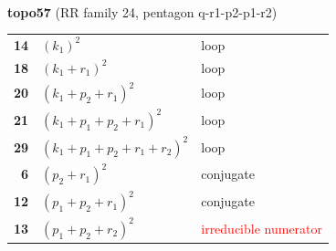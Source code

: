\documentclass[10pt]{article}
\begin{document}
\begin{minipage}[t]{0.48\textwidth}
{}\\[2mm]\textbf{topo57} (RR family 24, pentagon q-r1-p2-p1-r2)\\[2pt]{\footnotesize\begin{tabular}{@{}r@{\ \ }l@{\ \ }l@{}}\textbf{14} & $(k_1)^2$ & loop\\
\textbf{18} & $(k_1+r_1)^2$ & loop\\
\textbf{20} & $(k_1+p_2+r_1)^2$ & loop\\
\textbf{21} & $(k_1+p_1+p_2+r_1)^2$ & loop\\
\textbf{29} & $(k_1+p_1+p_2+r_1+r_2)^2$ & loop\\
\textbf{6} & $(p_2+r_1)^2$ & conjugate\\
\textbf{12} & $(p_1+p_2+r_1)^2$ & conjugate\\
\textbf{13} & $(p_1+p_2+r_2)^2$ & \textcolor{red}{irreducible numerator}\\\end{tabular}}\end{minipage}\hfill%
\end{document}
